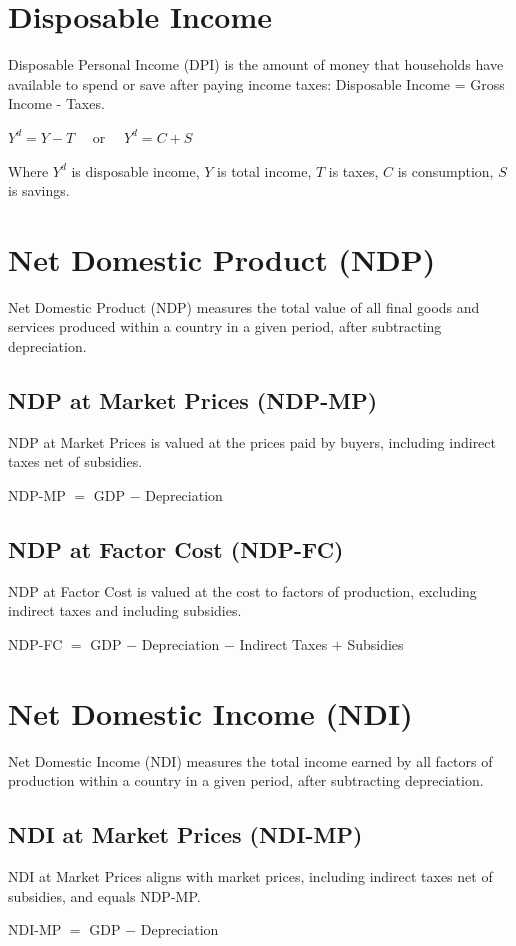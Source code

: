 \documentclass[a4paper, 11pt]{article}
\begin{document}
\section{Disposable Income}
Disposable Personal Income (DPI) is the amount of money that households have available to spend or save after paying income taxes: Disposable Income = Gross Income - Taxes.
\begin{center}
    $Y^d = Y - T \quad$ or $\quad Y^d = C + S$ 
\end{center}
Where $Y^d$ is disposable income, $Y$ is total income, $T$ is taxes, $C$ is consumption, $S$ is savings.

\section{Net Domestic Product (NDP)}
Net Domestic Product (NDP) measures the total value of all final goods and services produced within a country in a given period, after subtracting depreciation.

\subsection{NDP at Market Prices (NDP-MP)}
NDP at Market Prices is valued at the prices paid by buyers, including indirect taxes net of subsidies.
\begin{center}
    NDP-MP $=$ GDP $-$ Depreciation
\end{center}

\subsection{NDP at Factor Cost (NDP-FC)}
NDP at Factor Cost is valued at the cost to factors of production, excluding indirect taxes and including subsidies.
\begin{center}
    NDP-FC $=$ GDP $-$ Depreciation $-$ Indirect Taxes $+$ Subsidies
\end{center}

\section{Net Domestic Income (NDI)}
Net Domestic Income (NDI) measures the total income earned by all factors of production within a country in a given period, after subtracting depreciation.

\subsection{NDI at Market Prices (NDI-MP)}
NDI at Market Prices aligns with market prices, including indirect taxes net of subsidies, and equals NDP-MP.
\begin{center}
    NDI-MP $=$ GDP $-$ Depreciation
\end{center}
\end{document}
